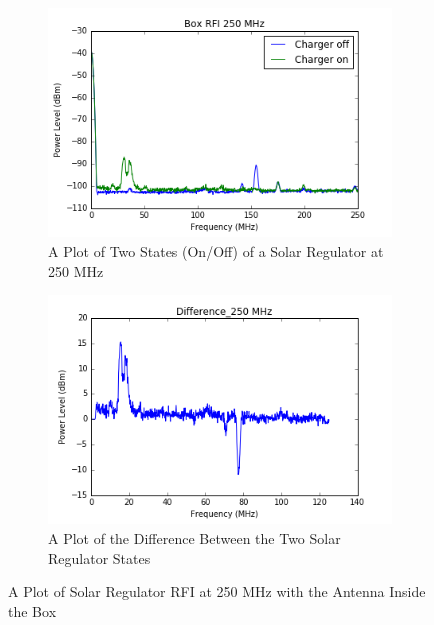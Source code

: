 \documentclass[12pt,a4paper]{report}
\begin{document}
\begin{figure}[!htb]
	\centering
	\begin{subfigure}{.5\textwidth}
		\centering
		\includegraphics[width=.9\linewidth]{Figures/box_rfi_charger_on_250mhz_1.png}
		\caption{A Plot of Two States (On/Off) of a Solar Regulator at 250 MHz}
		\label{Fig:250}
	\end{subfigure}%
	\begin{subfigure}{.5\textwidth}
		\centering
		\includegraphics[width=.9\linewidth]{Figures/1Difference_250mhz.png}
		\caption{A Plot of the Difference Between the Two Solar Regulator States}
		\label{Fig:dif250}
	\end{subfigure}
	\caption{A Plot of Solar Regulator RFI at 250 MHz with the Antenna Inside the Box}
	\label{Fig:2}
\end{figure}
\end{document}
